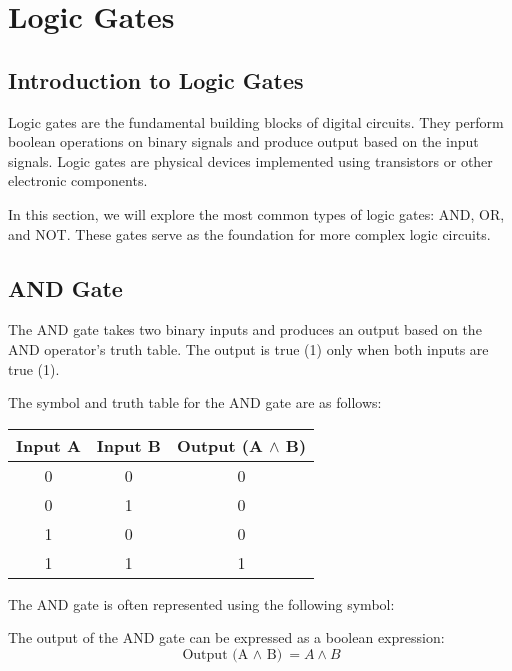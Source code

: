 \documentclass{article}
\begin{document}
\newpage

\section{Logic Gates}

\subsection{Introduction to Logic Gates}

Logic gates are the fundamental building blocks of digital circuits. They perform boolean operations on binary signals and produce output based on the input signals. Logic gates are physical devices implemented using transistors or other electronic components.

In this section, we will explore the most common types of logic gates: AND, OR, and NOT. These gates serve as the foundation for more complex logic circuits.

\subsection{AND Gate}

The AND gate takes two binary inputs and produces an output based on the AND operator's truth table. The output is true (1) only when both inputs are true (1).

The symbol and truth table for the AND gate are as follows:

\begin{center}
  \begin{tabular}{|c|c|c|}
    \hline
    \textbf{Input A} & \textbf{Input B} & \textbf{Output (A $\land$ B)} \\
    \hline
    0 & 0 & 0 \\
    0 & 1 & 0 \\
    1 & 0 & 0 \\
    1 & 1 & 1 \\
    \hline
  \end{tabular}
\end{center}

The AND gate is often represented using the following symbol:

\begin{center}
\end{center}

The output of the AND gate can be expressed as a boolean expression:
\[ \text{Output (A $\land$ B)} = A \land B \]
\end{document}
